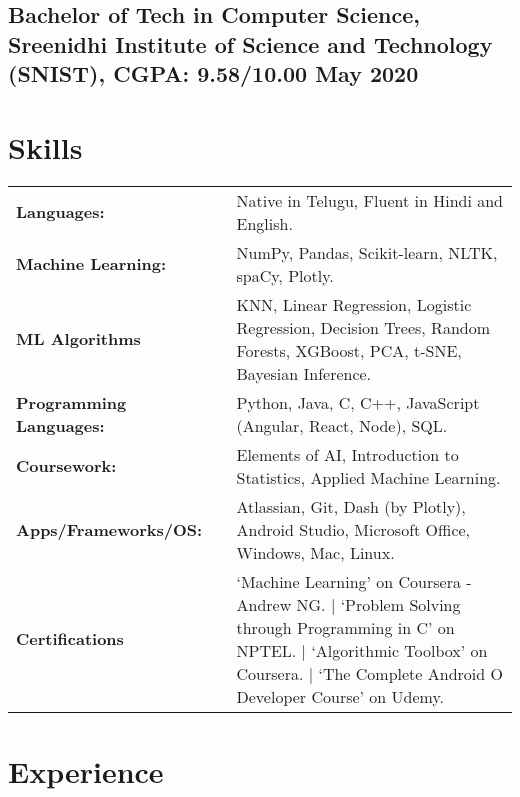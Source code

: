 \documentclass[a4,10pt]{article}
\newcommand{\hskills}[1]{
\textbf{\bfseries #1} }
\begin{document}
\subsection*{Bachelor of Tech in Computer Science, {\normalsize \normalfont Sreenidhi Institute of Science and Technology (SNIST), CGPA: 9.58/10.00} \hfill May 2020} 
\vspace{0.2cm}



\section{Skills}
\begin{tabular}{p{11em} p{1em} p{43em}}
\hskills{Languages:} &  & Native in Telugu, Fluent in Hindi and English. \\
\hskills{Machine Learning:} &  & NumPy, Pandas, Scikit-learn, NLTK, spaCy, Plotly. \\
\hskills{ML Algorithms} &  & KNN, Linear Regression, Logistic Regression, Decision Trees, Random Forests, XGBoost, PCA, t-SNE, Bayesian Inference. \\
\hskills{Programming Languages:}&  &  Python, Java, C, C++, JavaScript (Angular, React, Node), SQL.  \\
\hskills{Coursework:} &  &  Elements of AI, Introduction to Statistics, Applied Machine Learning.  \\
\hskills{Apps/Frameworks/OS:} &  & Atlassian, Git, Dash (by Plotly), Android Studio, Microsoft Office, Windows, Mac, Linux.   \\
\hskills{Certifications} &  & ‘Machine Learning’ on Coursera - Andrew NG. | ‘Problem Solving through Programming in C’ on NPTEL. | ‘Algorithmic Toolbox’ on Coursera. | ‘The Complete Android O Developer Course’ on Udemy. \\
\end{tabular}
\vspace{-0.2cm}




\section{Experience}
\end{document}
